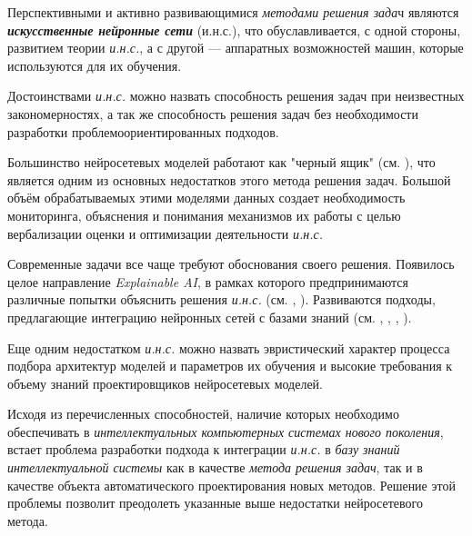 Перспективными и активно развивающимися \textit{методами решения зада}ч являются \textbf{\textit{искусственные нейронные сети}} (и.н.с.), что обуславливается, с одной стороны, развитием теории \textit{и.н.с.}, а с другой --- аппаратных возможностей машин, которые используются для их обучения.

Достоинствами \textit{и.н.с.} можно назвать способность решения задач при неизвестных закономерностях, а так же способность решения задач без необходимости разработки проблемоориентированных подходов.

Большинство нейросетевых моделей работают как "черный ящик"{} (см. ), что является одним из основных недостатков этого метода решения задач. Большой объём обрабатываемых этими моделями данных создает необходимость мониторинга, объяснения и понимания механизмов их работы с целью вербализации оценки и оптимизации деятельности \textit{и.н.с.}

Современные задачи все чаще требуют обоснования своего решения. Появилось целое направление \textit{Explainable AI}, в рамках которого предпринимаются различные попытки объяснить решения \textit{и.н.с.} (см. , ). Развиваются подходы, предлагающие интеграцию нейронных сетей с базами знаний (см. , , , ).

Еще одним недостатком \textit{и.н.с.} можно назвать эвристический характер процесса подбора архитектур моделей и параметров их обучения и высокие требования к объему знаний проектировщиков нейросетевых моделей.

Исходя из перечисленных способностей, наличие которых необходимо обеспечивать в \textit{интеллектуальных компьютерных системах нового поколения}, встает проблема разработки подхода к интеграции \textit{и.н.с.} в \textit{базу знаний} \textit{интеллектуальной системы} как в качестве \textit{метода решения задач}, так и в качестве объекта автоматического проектирования новых методов. Решение этой проблемы позволит преодолеть указанные выше недостатки нейросетевого метода.

